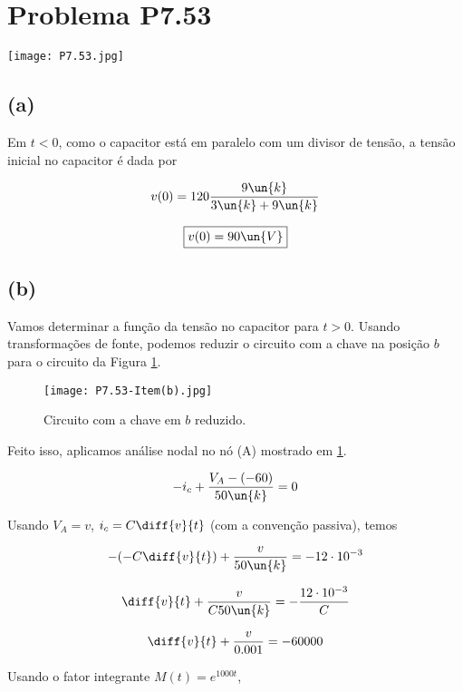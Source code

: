 
\section*{Problema P7.53}

\renewcommand*\thesection{7.53}

\begin{center}
    \texttt{[image: P7.53.jpg]}
\end{center}

\subsection*{(a)}

Em $t<0$, como o capacitor está em paralelo com um divisor de tensão, a tensão inicial no capacitor é dada por  

\[ v(0) = 120\frac{9\un{k}}{3\un{k} + 9\un{k}}  \]

\[ \boxed{v(0) = 90 \un{V}}  \]

\subsection*{(b)}

Vamos determinar a função da tensão no capacitor para $t>0$. Usando transformações de fonte,
podemos reduzir o circuito com a chave na posição $b$ para o circuito da Figura \ref*{fig:7.53.1}.

\begin{figure}[hb]
    \centering
    \caption{Circuito com a chave em $b$ reduzido.}
      \centering
      \texttt{[image: P7.53-Item(b).jpg]} \\
    \label{fig:7.53.1}
\end{figure}

Feito isso, aplicamos análise nodal no nó (A) mostrado em \ref*{fig:7.53.1}.

\[ -i_c + \frac{V_A - (-60)}{50\un{k}} = 0  \]

Usando $V_A = v$, $i_c = C\diff{v}{t}$ (com a convenção passiva), temos

\[ -(-C\diff{v}{t}) + \frac{v}{50\un{k}} = - 12 \cdot 10^{-3} \]

\[\diff{v}{t} + \frac{v}{C50\un{k}} = - \frac{12 \cdot 10^{-3}}{C} \]

\[ \diff{v}{t} + \frac{v}{0.001} = -60000 \]

Usando o fator integrante $M(t) = e^{1000t}$,


